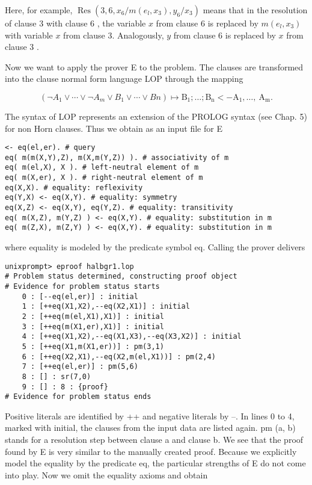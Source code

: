 \documentclass[10pt]{article}
\begin{document}
Here, for example, $\operatorname{Res}\left(3,6, x_{6} / m\left(e_{l}, x_{3}\right), y_{6} / x_{3}\right)$ means that in the resolution of clause 3 with clause 6 , the variable $x$ from clause 6 is replaced by $m\left(e_{l}, x_{3}\right)$ with variable $x$ from clause 3. Analogously, $y$ from clause 6 is replaced by $x$ from clause 3 .

Now we want to apply the prover E to the problem. The clauses are transformed into the clause normal form language LOP through the mapping

$$
\left(\neg A_{1} \vee \cdots \vee \neg A_{m} \vee B_{1} \vee \cdots \vee B n\right) \mapsto \mathrm{B}_{1} ; \ldots ; \mathrm{B}_{\mathrm{n}}<-\mathrm{A}_{1}, \ldots, \mathrm{~A}_{\mathrm{m}} .
$$

The syntax of LOP represents an extension of the PROLOG syntax (see Chap. 5) for non Horn clauses. Thus we obtain as an input file for E

\begin{verbatim}
<- eq(el,er). # query
eq( m(m(X,Y),Z), m(X,m(Y,Z)) ). # associativity of m
eq( m(el,X), X ). # left-neutral element of m
eq( m(X,er), X ). # right-neutral element of m
eq(X,X). # equality: reflexivity
eq(Y,X) <- eq(X,Y). # equality: symmetry
eq(X,Z) <- eq(X,Y), eq(Y,Z). # equality: transitivity
eq( m(X,Z), m(Y,Z) ) <- eq(X,Y). # equality: substitution in m
eq( m(Z,X), m(Z,Y) ) <- eq(X,Y). # equality: substitution in m
\end{verbatim}

where equality is modeled by the predicate symbol eq. Calling the prover delivers

\begin{verbatim}
unixprompt> eproof halbgr1.lop
# Problem status determined, constructing proof object
# Evidence for problem status starts
    0 : [--eq(el,er)] : initial
    1 : [++eq(X1,X2),--eq(X2,X1)] : initial
    2 : [++eq(m(el,X1),X1)] : initial
    3 : [++eq(m(X1,er),X1)] : initial
    4 : [++eq(X1,X2),--eq(X1,X3),--eq(X3,X2)] : initial
    5 : [++eq(X1,m(X1,er))] : pm(3,1)
    6 : [++eq(X2,X1),--eq(X2,m(el,X1))] : pm(2,4)
    7 : [++eq(el,er)] : pm(5,6)
    8 : [] : sr(7,0)
    9 : [] : 8 : {proof}
# Evidence for problem status ends
\end{verbatim}

Positive literals are identified by ++ and negative literals by --. In lines 0 to 4, marked with initial, the clauses from the input data are listed again. pm (a, b) stands for a resolution step between clause a and clause b. We see that the proof found by E is very similar to the manually created proof. Because we explicitly model the equality by the predicate eq, the particular strengths of E do not come into play. Now we omit the equality axioms and obtain
\end{document}
